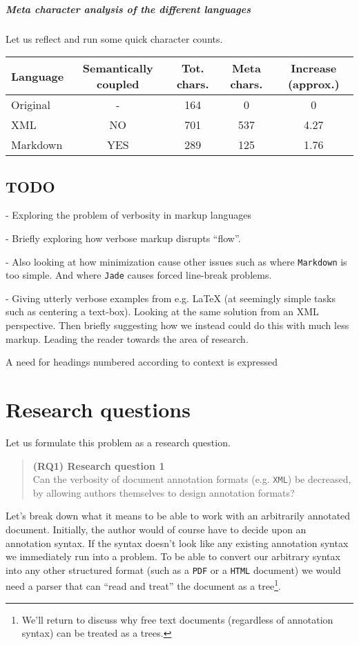 \documentclass{scrreprt}
\newcommand\researchquestionformat[1]{\begin{quote}#1\end{quote}}
\newcommand\firstresearchquestion{\researchquestionformat{%
  \textbf{(RQ1) Research question 1} \\
  Can the verbosity of document annotation formats (e.g. \texttt{XML}) be decreased, by allowing authors themselves to design annotation formats?%
}}
\begin{document}
\paragraph{Meta character analysis of the different languages}
Let us reflect and run some quick character counts.

\vspace{12pt}
\begin{tabular}{l c c c c}
Language
& Semantically coupled
& Tot. chars.
& Meta chars.
& Increase (approx.)
\\
\hline
Original & -   & 164 & 0   & 0\\
XML      & NO  & 701 & 537 & 4.27\\
Markdown & YES & 289 & 125 & 1.76
\end{tabular}
\vspace{12pt}






\section{TODO}
- Exploring the problem of verbosity in markup languages

- Briefly exploring how verbose markup disrupts ``flow''.

- Also looking at how minimization cause other issues such as where \texttt{Markdown} is too simple. And where \texttt{Jade} causes forced line-break problems.

- Giving utterly verbose examples from e.g. LaTeX (at seemingly simple tasks such as centering a text-box). Looking at the same solution from an XML perspective. Then briefly suggesting how we instead could do this with much less markup. Leading the reader towards the area of research.

A need for headings numbered according to context is expressed







\chapter{Research questions}
Let us formulate this problem as a research question.

\firstresearchquestion

Let's break down what it means to be able to work with an arbitrarily annotated document. Initially, the author would of course have to decide upon an annotation syntax. If the syntax doesn't look like any existing annotation syntax we immediately run into a problem. To be able to convert our arbitrary syntax into any other structured format (such as a \texttt{PDF} or a \texttt{HTML} document) we would need a parser that can ``read and treat'' the document as a tree\footnote{ We'll return to discuss why free text documents (regardless of annotation syntax) can be treated as a trees. }. %
\end{document}
